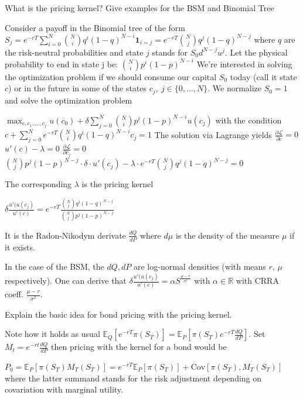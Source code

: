 What is the pricing kernel? Give examples for the BSM and Binomial Tree

Consider a payoff in the Binomial tree of the form
\( S_j = e^{-rT}\sum_{i=0}^N \binom{N}{i}q^i(1 - q)^{N-i}\mathbf{1}_{i=j} = e^{-rT} \binom{N}{j}q^j(1-q)^{N-j} \)
where \( q \) are the risk-neutral probabilities and state \( j \) stands for \( S_0d^{N-j}u^j \).
Let the physical probability to end in state j be:
\( \binom{N}{i}p^i(1 - p)^{N-i} \)
We're interested in solving the optimization problem if we should consume our capital \( S_0 \)
today (call it state \( c \)) or in the future in some of the states \(c_j,\ j \in \{0, \dots, N\} \).
We normalize \( S_0 = 1 \) and solve the optimization problem

\( \max_{c, c_1, \dots, c_j} u(c_0) + \delta \sum_{j=0}^N \binom{N}{i}p^i(1 - p)^{N-i}u(c_j)\)
with the condition
\( c + \sum_{j=0}^N e^{-rT} \binom{N}{i}q^i(1 - q)^{N-i} c_j = 1 \)
The solution via Lagrange yields
\(\frac{\partial \mathcal{L}}{\partial c} = 0\)
\(u'(c) - \lambda = 0\)
\(\frac{\partial \mathcal{L}}{\partial c_{j}} = 0 \)
\({\binom{N}{j}} p^j (1-p)^{N-j} \cdot \delta \cdot u'(c_{j}) - \lambda \cdot e^{-rT} \binom{N}{j} q^j (1-q)^{N-j} = 0\)

The corresponding \( \lambda \) is the pricing kernel

\( \delta \frac{u'(u(c_j)}{u'(c)} = e^{-rT}\frac{\binom{N}{j}q^j(1 - q)^{N-j}}{\binom{N}{j}p^j(1 - p)^{N-j}} \)

It is the Radon-Nikodym derivate \( \frac{dQ}{dP} \) where \( d\mu \) is the density of the measure \( \mu \) if it exists.

In the case of the BSM, the \( dQ, dP \) are log-normal densities (with means \( r \), \( \mu \) respectively).
One can derive that
\( \delta \frac{u'(u(c_j)}{u'(c)} = \alpha S^{\frac{\mu -r}{\sigma^2}} \)
with \( \alpha \in \mathbb{R} \) with CRRA coeff. \( \frac{\mu -r}{\sigma^2} \).


Explain the basic idea for bond pricing with the pricing kernel.

Note how it holds as usual \( \mathbb{E}_Q[e^{-rT}\pi(S_T)] = \mathbb{E}_P[\pi(S_T)e^{-rT}\frac{dQ}{dP}] \).
Set \( M_t = e^{-rt}\frac{dQ}{dP} \) then pricing with the kernel for a bond would be

\( P_0 = \mathbb{E}_P[\pi(S_T)M_T(S_T)] = e^{-rT}\mathbb{E}_P[\pi(S_T)] + \text{Cov}[\pi(S_T), M_T(S_T)]\)
where the latter summand stands for the risk adjustment depending on covariation with marginal utility.


